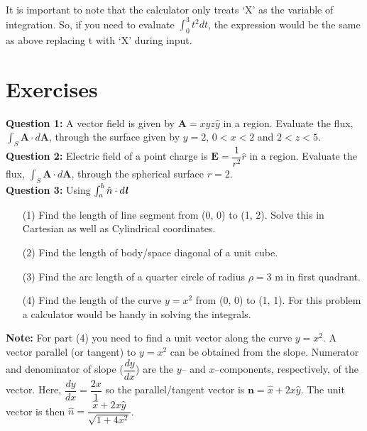 \documentclass[12pt,a4paper]{article}
\begin{document}
It is important to note that the calculator only treats `X' as the variable of integration. So, if you need to evaluate $\int_{0}^{3}t^2dt$, the expression would be the same as above replacing t with `X' during input.
\section{Exercises}
\noindent\textbf{Question 1:} A vector field is given by $\textbf{A}=xyz\hat y$ in a region. Evaluate the flux, $\int_{S}\textbf{A}\cdot d\textbf{A}$, through the surface given by $y=2$, $0<x<2$ and $2<z<5$.\\[0.2cm]
\noindent\textbf{Question 2:} Electric field of a point charge is $\textbf{E}=\dfrac{1}{r^2}\hat r$ in a region. Evaluate the flux, $\int_{S}\textbf{A}\cdot d\textbf{A}$, through the spherical surface $r=2$.\\[0.2cm]
\noindent\textbf{Question 3:} Using $\int_{a}^{b}\hat n\cdot d\textbf{\textit{l}}$
\begin{itemize}
\item[(1)] Find the length of line segment from (0, 0) to (1, 2). Solve this in Cartesian as well as Cylindrical coordinates.
\item[(2)] Find the length of body/space diagonal of a unit cube.
\item[(3)] Find the arc length of a quarter circle of radius $\rho=3$ m in first quadrant.
\item[(4)] Find the length of the curve $y=x^2$ from (0, 0) to (1, 1). For this problem a calculator would be handy in solving the integrals.
\end{itemize}
\noindent\textbf{Note:} For part (4) you need to find a unit vector along the curve $y=x^2$. A vector parallel (or tangent) to $y=x^2$ can be obtained from the slope. Numerator and denominator of slope ($\dfrac{dy}{dx}$) are the $y$-- and $x$--components, respectively, of the vector. Here, $\dfrac{dy}{dx}=\dfrac{2x}{1}$ so the parallel/tangent vector is $\textbf{n}=\hat x+2x\hat y$. The unit vector is then $\hat n=\dfrac{\hat x+2x\hat y}{\sqrt{1+4x^2}}$.\\[0.2cm]


\end{document}
